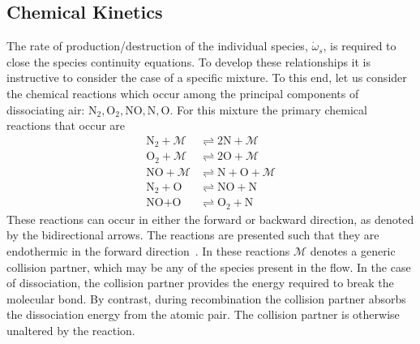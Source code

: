 \subsection{Chemical Kinetics}
The rate of production/destruction of the individual species, $\dot{\omega}_s$, is required to close the species continuity equations.  To develop these relationships it is instructive to consider the case of a specific mixture.  To this end, let us consider the chemical reactions which occur among the principal components of dissociating air: $\text{N}_2,\text{O}_2,\text{NO},\text{N},\text{O}$.  For this mixture the primary chemical reactions that occur are
\begin{align*}
  \text{N}_2 + \mathcal{M} &\rightleftharpoons 2\text{N} + \mathcal{M} \\
  \text{O}_2 + \mathcal{M} &\rightleftharpoons 2\text{O} + \mathcal{M} \\
  \text{NO} + \mathcal{M}  &\rightleftharpoons \text{N} + \text{O} + \mathcal{M} \\
  \text{N}_2 + \text{O}    &\rightleftharpoons \text{NO} + \text{N} \\
  \text{NO} + \text{O}     &\rightleftharpoons \text{O}_2 + \text{N}  
\end{align*}
These reactions can occur in either the forward or backward direction, as denoted by the bidirectional arrows.  The reactions are presented such that they are endothermic in the forward direction~\cite{wright_thesis}.  In these reactions $\mathcal{M}$ denotes a generic collision partner, which may be any of the species present in the flow. In the case of dissociation, the collision partner provides the energy required to break the molecular bond.  By contrast, during recombination the collision partner absorbs the dissociation energy from the atomic pair.  The collision partner is otherwise unaltered by the reaction.

